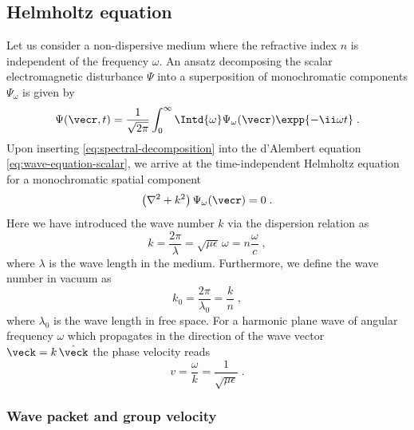 \documentclass[
twoside,
openright,
titlepage,
numbers=noenddot,
headinclude,
fleqn,
a4paper,
footinclude=true,
cleardoublepage=empty,
abstractoff,
BCOR=5mm,
paper=a4,
fontsize=11pt,
british,ngerman,american,
]{scrreprt}
\begin{document}
\subsection{Helmholtz equation}
\label{sec:helmholtz}

Let us consider a non-dispersive medium where the refractive index $n$
is independent of the frequency $\omega$.  An ansatz decomposing the
scalar electromagnetic disturbance $\Psi$ into a superposition of
monochromatic components $\Psi_\omega$ is given by
\begin{equation}
  \label{eq:spectral-decomposition}
  \Psi(\vecr,t) = \frac{1}{\sqrt{2\pi}}
  \int_0^{\infty}\Intd{\omega}\Psi_{\omega}(\vecr)\expp{-\ii\omega t}\;.
\end{equation}
Upon inserting \cref{eq:spectral-decomposition} into the d'Alembert
equation \eqref{eq:wave-equation-scalar}, we arrive at the
time-independent Helmholtz equation for a monochromatic spatial
component
\begin{equation}
  \label{eq:helmholtz}
    \left(\nabla^2 + k^2\right)\Psi_\omega(\vecr)=0\;.
\end{equation}
Here we have introduced the wave number $k$ via the dispersion
relation as
\begin{equation}
  \label{eq:dispersion}
  k=\frac{2\pi}{\lambda}=\sqrt{\mu\epsilon}\,\omega
  =n\frac{\omega}{c} \;,
\end{equation}
where $\lambda$ is the wave length in the medium.  Furthermore, we
define the wave number in vacuum as
\begin{equation}
  \label{eq:wave-number-vacuum}
  k_0=\frac{2\pi}{\lambda_0}=\frac{k}{n} \;,
\end{equation}
where $\lambda_0$ is the wave length in free space.  For a harmonic
plane wave of angular frequency $\omega$ which propagates in the
direction of the wave vector $\veck = k\,\hat{\veck}$ the phase
velocity reads
\begin{equation}
  \label{eq:phase-velocity-2}
  v=\frac{\omega}{k} = \frac{1}{\sqrt{\mu\epsilon}}\;.
\end{equation}

\subsubsection{Wave packet and group velocity}
\label{sec:wave-packet}
\end{document}
